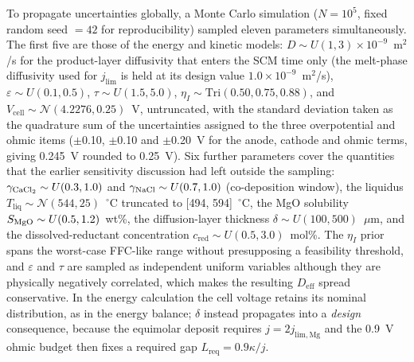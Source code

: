 \documentclass[pdflatex,sn-basic,Numbered]{sn-jnl}
\begin{document}
To propagate uncertainties globally, a Monte Carlo simulation ($N = 10^5$, fixed random seed $= 42$ for reproducibility) sampled eleven parameters simultaneously. The first five are those of the energy and kinetic models: $D \sim U(1, 3) \times 10^{-9}$~m$^2$/s for the product-layer diffusivity that enters the SCM time only (the melt-phase diffusivity used for $j_{\mathrm{lim}}$ is held at its design value $1.0\times10^{-9}$~m$^2$/s), $\varepsilon \sim U(0.1, 0.5)$, $\tau \sim U(1.5, 5.0)$, $\eta_I \sim \mathrm{Tri}(0.50, 0.75, 0.88)$, and $V_{\mathrm{cell}} \sim \mathcal{N}(4.2276, 0.25)$~V, untruncated, with the standard deviation taken as the quadrature sum of the uncertainties assigned to the three overpotential and ohmic items ($\pm$0.10, $\pm$0.10 and $\pm$0.20~V for the anode, cathode and ohmic terms, giving 0.245~V rounded to 0.25~V). Six further parameters cover the quantities that the earlier sensitivity discussion had left outside the sampling: $\gamma_{\ce{CaCl2}} \sim U(0.3, 1.0)$ and $\gamma_{\ce{NaCl}} \sim U(0.7, 1.0)$ (co-deposition window), the liquidus $T_{\mathrm{liq}} \sim \mathcal{N}(544, 25)$~$^{\circ}$C truncated to [494, 594]~$^{\circ}$C, the MgO solubility $S_{\ce{MgO}} \sim U(0.5, 1.2)$~wt\%, the diffusion-layer thickness $\delta \sim U(100, 500)$~$\mu$m, and the dissolved-reductant concentration $c_{\mathrm{red}} \sim U(0.5, 3.0)$~mol\%. The $\eta_I$ prior spans the worst-case FFC-like range without presupposing a feasibility threshold, and $\varepsilon$ and $\tau$ are sampled as independent uniform variables although they are physically negatively correlated, which makes the resulting $D_{\mathrm{eff}}$ spread conservative. In the energy calculation the cell voltage retains its nominal distribution, as in the energy balance; $\delta$ instead propagates into a \emph{design} consequence, because the equimolar deposit requires $j = 2j_{\mathrm{lim,Mg}}$ and the 0.9~V ohmic budget then fixes a required gap $L_{\mathrm{req}} = 0.9\kappa/j$.
\end{document}

